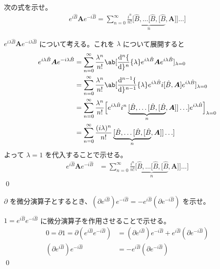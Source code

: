 \documentclass[uplatex,dvipdfmx,a4paper,11pt]{jlreq}
\makeatletter
\newcommand{\BB}{\bm{B}}
\renewcommand{\AA}{\hat{A}}
\renewcommand{\BB}{\hat{B}}
\renewcommand{\AA}{\bm{A}}
\numberwithin{equation}{section}
\theoremstyle{definition}
\renewenvironment{proof}[1][\proofname]{\par
  \normalfont
  \topsep6\p@\@plus6\p@ \trivlist
  \item[\hskip\labelsep{\bfseries #1}\@addpunct{\bfseries}]\ignorespaces\quad\par
}{%
  \qed\endtrivlist\@endpefalse
}
\renewcommand\proofname{証明}
\makeatother
\begin{document}
\begin{problem}
次の式を示せ。
\begin{align}
  e^{i\BB}\AA e^{-i\BB} = \sum_{n=0}^{\infty}\frac{i^n}{n!}\underbrace{[\BB, \ldots [\BB, [\BB}_{n}, \AA]] \ldots]
\end{align}
\end{problem}
\begin{proof}
  $e^{i\lambda\BB}\AA e^{-i\lambda\BB}$ について考える。これを $\lambda$ について展開すると
  \begin{align}
    e^{i\lambda\BB}\AA e^{-i\lambda\BB} & = \sum_{n=0}^{\infty}\frac{\lambda^n}{n!}\ab[\diff[n]{}{\lambda}e^{i\lambda\BB}\AA e^{i\lambda\BB}]_{\lambda = 0}                                         \\
                                        & = \sum_{n=0}^{\infty}\frac{\lambda^n}{n!}\ab[\diff[n-1]{}{\lambda}e^{i\lambda\BB}i[\BB, \AA]e^{i\lambda\BB}]_{\lambda = 0}                                \\
                                        & = \sum_{n=0}^{\infty}\frac{\lambda^n}{n!}\Big[e^{i\lambda\BB}i^n\underbrace{[\BB, \ldots [\BB, [\BB}_{n}, \AA]] \ldots]e^{i\lambda\BB}\Big]_{\lambda = 0} \\
                                        & = \sum_{n=0}^{\infty}\frac{(i\lambda)^n}{n!}\underbrace{[\BB, \ldots [\BB, [\BB}_{n}, \AA]] \ldots]
  \end{align}
  よって $\lambda = 1$ を代入することで示せる。
  \begin{align}
    e^{i\BB}\AA e^{-i\BB} & = \sum_{n=0}^{\infty}\frac{i^n}{n!}\underbrace{[\BB, \ldots [\BB, [\BB}_{n}, \AA]] \ldots]
  \end{align}
\end{proof}

\begin{problem}
$\partial$ を微分演算子とするとき、$(\partial e^{i\BB})e^{-i\BB} = -e^{i\BB}(\partial e^{-i\BB})$ を示せ。
\end{problem}
\begin{proof}
  $1 = e^{i\BB}e^{-i\BB}$ に微分演算子を作用させることで示せる。
  \begin{align}
    0 = \partial 1 = \partial(e^{i\BB}e^{-i\BB}) & = (\partial e^{i\BB})e^{-i\BB} + e^{i\BB}(\partial e^{-i\BB}) \\
    (\partial e^{i\BB})e^{-i\BB}                 & = -e^{i\BB}(\partial e^{-i\BB})
  \end{align}
\end{proof}
\end{document}
